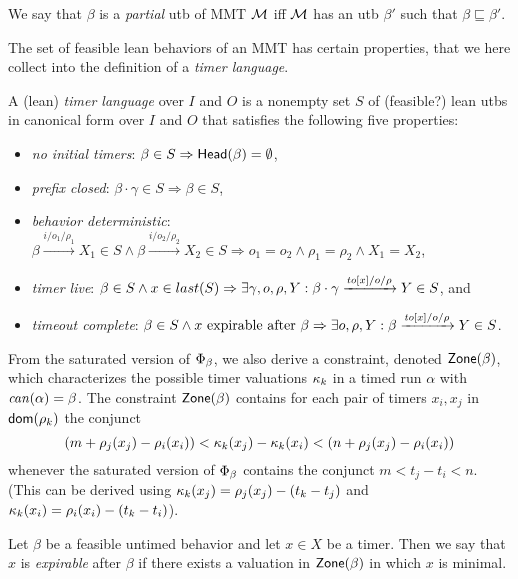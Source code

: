 We say that $\beta$ is a \emph{partial} utb of MMT ${\mathcal M}$ iff ${\mathcal M}$ has an utb $\beta'$ such that $\beta \sqsubseteq \beta'$.


The set of feasible lean behaviors of an MMT has certain properties, that
we here collect into the definition of a \emph{timer language}.

\begin{definition}
\label{def:timer language}
A (lean) \emph{timer language} over $I$ and $O$ is a nonempty set 
$S$ of (feasible?) lean utbs in canonical form over $I$ and $O$ that satisfies the following five properties:
\begin{itemize}
\item
\emph{no initial timers}: $\beta \in S \Rightarrow \mathsf{Head}({\beta}) = \emptyset$,
\item
\emph{prefix closed}: $\beta \cdot \gamma \in S \Rightarrow \beta \in S$,
\item
\emph{behavior deterministic}:
$\beta \xrightarrow{i/o_1/\rho_1} X_1 \in S \wedge \beta \xrightarrow{i/o_2/\rho_2} X_2 \in S \Rightarrow o_1 = o_2 \wedge \rho_1 = \rho_2 \wedge X_1 = X_2$,
\item
\emph{timer live}:
$\beta \in S \wedge x \in last(S) \Rightarrow \exists \gamma, o, \rho, Y : \beta \cdot \gamma \xrightarrow{\mathit{to}[x]/o/\rho} Y \in S$,
and
\item
\emph{timeout complete}:
$\beta \in S \wedge x \mbox{ expirable after } \beta \Rightarrow
\exists o, \rho, Y: \beta \xrightarrow{\mathit{to}[x]/o/\rho} Y \in S$.
\end{itemize}
\end{definition}

From the saturated version of $\Phi_{\beta}$, we also derive a constraint,
denoted $\mathsf{Zone}({\beta})$,
which characterizes the possible timer valuations $\kappa_k$ in a timed run
$\alpha$ with $\mathit{can}({\alpha}) = \beta$.
The constraint $\mathsf{Zone}({\beta})$
contains for each pair of timers $x_i,x_j$ in ${\textsf{dom}}(\rho_k)$ the conjunct
\[
(m + \rho_j(x_j) - \rho_i(x_i)) < \kappa_k(x_j) -\kappa_k(x_i) < (n + \rho_j(x_j) - \rho_i(x_i))
\]
whenever the saturated version of $\Phi_{\beta}$ contains the conjunct
\(
m < t_j - t_i < n
\).
(This can be derived using
$\kappa_k(x_j) = \rho_j(x_j) - (t_k - t_j)$
and
$\kappa_k(x_i) = \rho_i(x_i) - (t_k - t_i)$).

Let $\beta$ be a feasible untimed behavior and let $x \in X$ be a timer. Then we say that $x$ is \emph{expirable} after $\beta$
if there exists a valuation in $\mathsf{Zone}({\beta})$ in which $x$ is minimal.


